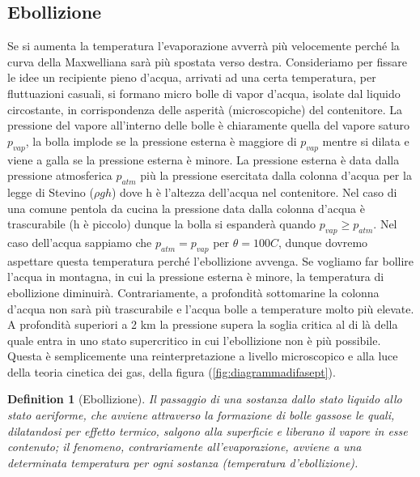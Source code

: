 \documentclass[10pt,a4paper]{article}
\newtheorem{definition}{Definition}
\begin{document}
\subsection{Ebollizione}
Se si aumenta la temperatura l'evaporazione avverrà più velocemente perché la curva della Maxwelliana sarà più spostata verso destra. Consideriamo per fissare le idee un recipiente pieno d'acqua, arrivati ad una certa temperatura, per fluttuazioni casuali, si formano micro bolle di vapor d'acqua, isolate dal liquido circostante, in corrispondenza delle asperità (microscopiche) del contenitore. La pressione del vapore all'interno delle bolle è chiaramente quella del vapore saturo $p_{vap}$, la bolla implode se la pressione esterna è maggiore di $p_{vap}$ mentre si dilata e viene a galla se la pressione esterna è minore. La pressione esterna è data dalla pressione atmosferica $p_{atm}$ più la pressione esercitata dalla colonna d'acqua per la legge di Stevino ($\rho g h$) dove h è l'altezza dell'acqua nel contenitore. Nel caso di una comune pentola da cucina la pressione data dalla colonna d'acqua è trascurabile (h è piccolo) dunque la bolla si espanderà quando $p_{vap} \geq p_{atm}$. Nel caso dell'acqua sappiamo che $p_{atm} = p_{vap}$ per $\theta = 100 C$, dunque dovremo aspettare questa temperatura perché l'ebollizione avvenga. Se vogliamo far bollire l'acqua in montagna, in cui la pressione esterna è minore, la temperatura di ebollizione diminuirà. Contrariamente, a profondità sottomarine la colonna d'acqua non sarà più trascurabile e l'acqua bolle a temperature molto più elevate. A profondità superiori a 2 km la pressione supera la soglia critica al di là della quale entra in uno stato supercritico in cui l'ebollizione non è più possibile. Questa è semplicemente una reinterpretazione a livello microscopico e alla luce della teoria cinetica dei gas, della figura (\ref{fig:diagrammadifasept}). 
\begin{definition}[Ebollizione]
	Il passaggio di una sostanza dallo stato liquido allo stato aeriforme, che avviene attraverso la formazione di bolle gassose le quali, dilatandosi per effetto termico, salgono alla superficie e liberano il vapore in esse contenuto; il fenomeno, contrariamente all'evaporazione, avviene a una determinata temperatura per ogni sostanza (temperatura d'ebollizione).
\end{definition}
\end{document}
